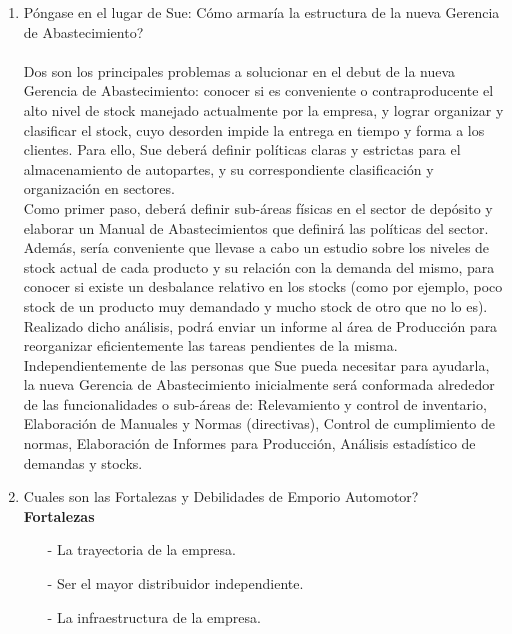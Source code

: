 \documentclass[a4paper,10pt,titlepage]{article}
\begin{document}
\begin{enumerate}
  \item P\'ongase en el lugar de Sue: C\'omo armar\'ia la estructura de la nueva Gerencia de Abastecimiento?
  \\ \\
  \indent Dos son los principales problemas a solucionar en el debut de la nueva Gerencia de Abastecimiento: conocer si es conveniente o contraproducente el alto nivel de stock manejado actualmente por la empresa, y lograr organizar y clasificar el stock, cuyo desorden impide la entrega en tiempo y forma a los clientes. Para ello, Sue deber\'a definir pol\'iticas claras y estrictas para el almacenamiento de autopartes, y su correspondiente clasificaci\'on y organizaci\'on en sectores.\\
  \indent Como primer paso, deber\'a definir sub-\'areas f\'isicas en el sector de dep\'osito y elaborar un Manual de Abastecimientos que definir\'a las pol\'iticas del sector. Adem\'as, ser\'ia conveniente que llevase a cabo un estudio sobre los niveles de stock actual de cada producto y su relaci\'on con la demanda del mismo, para conocer si existe un desbalance relativo en los stocks (como por ejemplo, poco stock de un producto muy demandado y mucho stock de otro que no lo es).\\
  \indent Realizado dicho an\'alisis, podr\'a enviar un informe al \'area de Producci\'on para reorganizar eficientemente las tareas pendientes de la misma. Independientemente de las personas que Sue pueda necesitar para ayudarla, la nueva Gerencia de Abastecimiento inicialmente ser\'a conformada alrededor de las funcionalidades o sub-\'areas de: Relevamiento y control de inventario, Elaboraci\'on de Manuales y Normas (directivas), Control de cumplimiento de normas, Elaboraci\'on de Informes para Producci\'on, An\'alisis estad\'istico de demandas y stocks.
  
  
  \item Cuales son las Fortalezas y Debilidades de Emporio Automotor?\\ 

     \textbf{Fortalezas }
    
    \begin{enumerate}
      \item[-] La trayectoria de la empresa.
      \item[-] Ser el mayor distribuidor independiente.
      \item[-] La infraestructura de la empresa.
     \end{enumerate}  


\end{enumerate}
\end{document}
